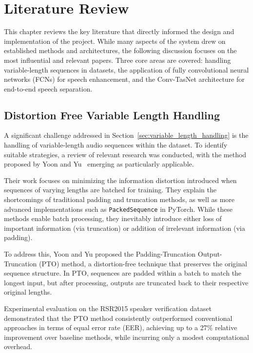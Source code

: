 \graphicspath{{content/chapters/3_literature/figures/}}
\chapter{Literature Review}
\label{sec:literature_review}

This chapter reviews the key literature that directly informed the design and implementation of the project. While many aspects of the system drew on established methods and architectures, the following discussion focuses on the most influential and relevant papers. Three core areas are covered: handling variable-length sequences in datasets, the application of fully convolutional neural networks (FCNs) for speech enhancement, and the Conv-TasNet architecture for end-to-end speech separation.

\section{Distortion Free Variable Length Handling} 
\label{sec:distortion_free_handling}

A significant challenge addressed in Section~\ref{sec:variable_length_handling} is the handling of variable-length audio sequences within the dataset. To identify suitable strategies, a review of relevant research was conducted, with the method proposed by Yoon and Yu~\cite{yoon2020pto} emerging as particularly applicable.

Their work focuses on minimizing the information distortion introduced when sequences of varying lengths are batched for training. They explain the shortcomings of traditional padding and truncation methods, as well as more advanced implementations such as \texttt{PackedSequence} in PyTorch. While these methods enable batch processing, they inevitably introduce either loss of important information (via truncation) or addition of irrelevant information (via padding).

To address this, Yoon and Yu proposed the Padding-Truncation Output-Truncation (PTO) method, a distortion-free technique that preserves the original sequence structure. In PTO, sequences are padded within a batch to match the longest input, but after processing, outputs are truncated back to their respective original lengths.

Experimental evaluation on the RSR2015 speaker verification dataset demonstrated that the PTO method consistently outperformed conventional approaches in terms of equal error rate (EER), achieving up to a 27\% relative improvement over baseline methods, while incurring only a modest computational overhead.

